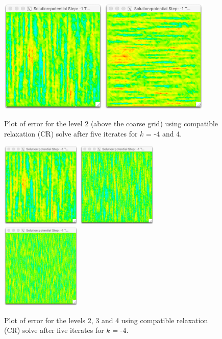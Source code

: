 \begin{refsection}
\begin{figure}
\centering
\includegraphics[width=2in]{figures/errorCRAnisoKm4_r6.png}\hfil
\includegraphics[width=2in]{figures/errorCRAnisoK4_r6.png}
\caption{Plot of error for the level 2 (above the coarse grid) using compatible relaxation (CR) solve after five iterates for $k$ = -4 and 4.\label{fig:errorCRAnisoK}}
\end{figure}

\begin{figure}
\centering
\includegraphics[width=1.5in]{figures/errorCRAnisoKm4_r6.png}\hfil
\includegraphics[width=1.5in]{figures/errorCRAnisoKm4_L3_r6.png}\hfil
\includegraphics[width=1.5in]{figures/errorCRAnisoKm4_L4_r6.png}
\caption{Plot of error for the levels 2, 3 and 4 using compatible relaxation (CR) solve after five iterates for $k$ = -4.\label{fig:errorCRAnisoL}}
\end{figure}



\end{refsection}
